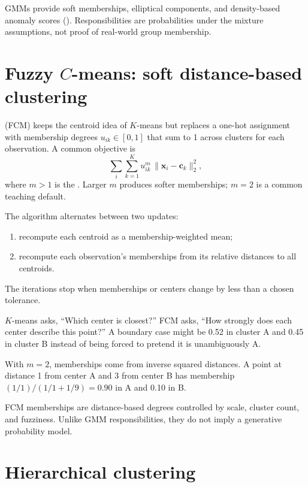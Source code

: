GMMs provide soft memberships, elliptical components, and density-based anomaly scores (). Responsibilities are probabilities under the mixture assumptions, not proof of real-world group membership.

\section{Fuzzy $C$-means: soft distance-based clustering}

 (FCM) keeps the centroid idea of $K$-means but replaces a one-hot assignment with membership degrees $u_{ik}\in[0,1]$ that sum to 1 across clusters for each observation. A common objective is
\[
  \sum_i\sum_{k=1}^{K} u_{ik}^{m}\,\|\bm{x}_i-\bm{c}_k\|_2^2,
\]
where $m>1$ is the . Larger $m$ produces softer memberships; $m=2$ is a common teaching default.

The algorithm alternates between two updates:
\begin{enumerate}
  \item recompute each centroid as a membership-weighted mean;
  \item recompute each observation's memberships from its relative distances to all centroids.
\end{enumerate}
The iterations stop when memberships or centers change by less than a chosen tolerance.

\begin{intuition}
$K$-means asks, ``Which center is closest?'' FCM asks, ``How strongly does each center describe this point?'' A boundary case might be 0.52 in cluster A and 0.45 in cluster B instead of being forced to pretend it is unambiguously A.
\end{intuition}

\begin{workedexample}
With $m=2$, memberships come from inverse squared distances. A point at distance 1 from center A and 3 from center B has membership $(1/1)/(1/1+1/9)=0.90$ in A and 0.10 in B.
\end{workedexample}

\begin{pitfall}
FCM memberships are distance-based degrees controlled by scale, cluster count, and fuzziness. Unlike GMM responsibilities, they do not imply a generative probability model.
\end{pitfall}

\section{Hierarchical clustering}
\label{sec:hierarchical-clustering}

